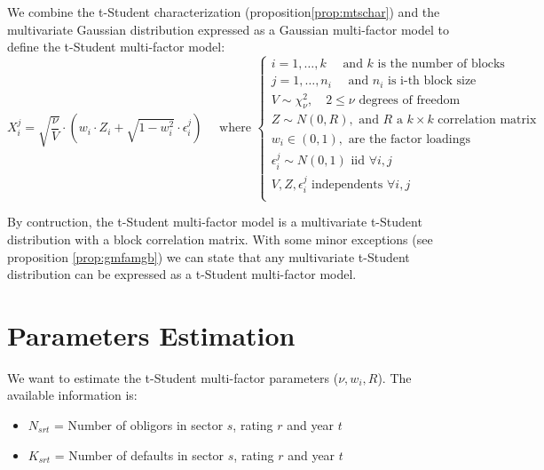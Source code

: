 \documentclass[11pt,fleqn]{book} %
\begin{document}
\begin{definition}
We combine the t-Student characterization (proposition\ref{prop:mtschar})
and the multivariate Gaussian distribution expressed as a
Gaussian multi-factor model to define the t-Student multi-factor
model:
\begin{displaymath}
X_i^j = \sqrt{\frac{\nu}{V}} \cdot 
\left( w_i \cdot Z_i + \sqrt{1-w_i^2} \cdot \epsilon_i^j \right)
\quad \text{ where } \left\{
\begin{array}{l}
i = 1, \dots, k \quad \text{ and $k$ is the number of blocks} \\
j = 1, \dots, n_i \quad \text{ and $n_i$ is i-th block size} \\
V \sim \chi_{\nu}^2, \quad 2 \le \nu \text{ degrees of freedom} \\
Z \sim N(0,R), \text{ and $R$ a $k \times k$ correlation matrix} \\
w_i \in (0,1), \text{ are the factor loadings } \\
\epsilon_i^j \sim N(0,1) \text { iid } \forall i,j \\
V, Z, \epsilon_i^j \text{ independents } \forall i,j \\
\end{array}
\right.
\end{displaymath}
\end{definition}

By contruction, the t-Student multi-factor model is a multivariate
t-Student distribution with a block correlation matrix. With some
minor exceptions (see proposition \ref{prop:gmfamgb}) we can 
state that any multivariate t-Student distribution can be expressed
as a t-Student multi-factor model.

\chapter{Parameters Estimation}

We want to estimate the t-Student multi-factor parameters 
($\nu, w_i, R$). The available information is:
\begin{itemize}
\item $N_{srt}$ = Number of obligors in sector $s$, rating $r$ and year $t$
\item $K_{srt}$ = Number of defaults in sector $s$, rating $r$ and year $t$
\end{itemize}
\end{document}
